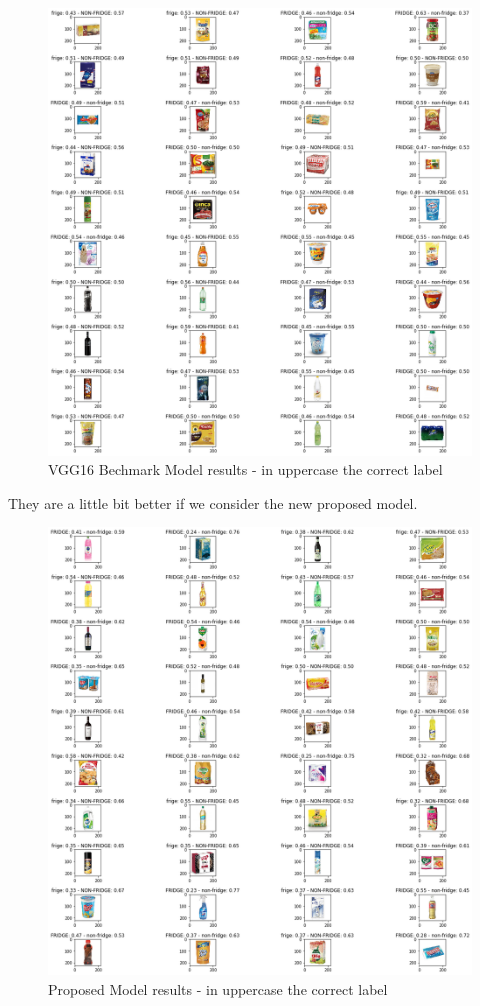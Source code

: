 \documentclass[a4paper,10pt]{article}
\begin{document}
\begin{figure}[ht]
  \includegraphics[width=\linewidth]{vgg16_results.png}
  \caption{VGG16 Bechmark Model results - in uppercase the correct label}
\end{figure}

\newpage

They are a little bit better if we consider the new proposed model.
\begin{figure}[ht]
  \includegraphics[width=\linewidth]{my_net_results.png}
  \caption{Proposed Model results - in uppercase the correct label}
\end{figure}
\end{document}
